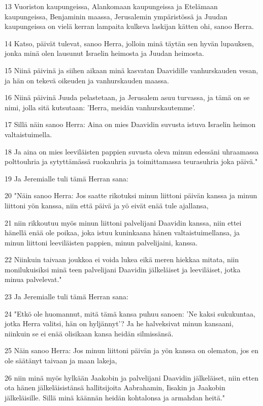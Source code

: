 \par 13 Vuoriston kaupungeissa, Alankomaan kaupungeissa ja Etelämaan kaupungeissa, Benjaminin maassa, Jerusalemin ympäristössä ja Juudan kaupungeissa on vielä kerran lampaita kulkeva laskijan kätten ohi, sanoo Herra.
\par 14 Katso, päivät tulevat, sanoo Herra, jolloin minä täytän sen hyvän lupauksen, jonka minä olen lausunut Israelin heimosta ja Juudan heimosta.
\par 15 Niinä päivinä ja siihen aikaan minä kasvatan Daavidille vanhurskauden vesan, ja hän on tekevä oikeuden ja vanhurskauden maassa.
\par 16 Niinä päivinä Juuda pelastetaan, ja Jerusalem asuu turvassa, ja tämä on se nimi, jolla sitä kutsutaan: 'Herra, meidän vanhurskautemme'.
\par 17 Sillä näin sanoo Herra: Aina on mies Daavidin suvusta istuva Israelin heimon valtaistuimella.
\par 18 Ja aina on mies leeviläisten pappien suvusta oleva minun edessäni uhraamassa polttouhria ja sytyttämässä ruokauhria ja toimittamassa teurasuhria joka päivä."
\par 19 Ja Jeremialle tuli tämä Herran sana:
\par 20 "Näin sanoo Herra: Jos saatte rikotuksi minun liittoni päivän kanssa ja minun liittoni yön kanssa, niin että päivä ja yö eivät enää tule ajallansa,
\par 21 niin rikkoutuu myös minun liittoni palvelijani Daavidin kanssa, niin ettei hänellä enää ole poikaa, joka istuu kuninkaana hänen valtaistuimellansa, ja minun liittoni leeviläisten pappien, minun palvelijaini, kanssa.
\par 22 Niinkuin taivaan joukkoa ei voida lukea eikä meren hiekkaa mitata, niin monilukuisiksi minä teen palvelijani Daavidin jälkeläiset ja leeviläiset, jotka minua palvelevat."
\par 23 Ja Jeremialle tuli tämä Herran sana:
\par 24 "Etkö ole huomannut, mitä tämä kansa puhuu sanoen: 'Ne kaksi sukukuntaa, jotka Herra valitsi, hän on hyljännyt'? Ja he halveksivat minun kansaani, niinkuin se ei enää olisikaan kansa heidän silmissänsä.
\par 25 Näin sanoo Herra: Jos minun liittoni päivän ja yön kanssa on olematon, jos en ole säätänyt taivaan ja maan lakeja,
\par 26 niin minä myös hylkään Jaakobin ja palvelijani Daavidin jälkeläiset, niin etten ota hänen jälkeläisistänsä hallitsijoita Aabrahamin, Iisakin ja Jaakobin jälkeläisille. Sillä minä käännän heidän kohtalonsa ja armahdan heitä."

